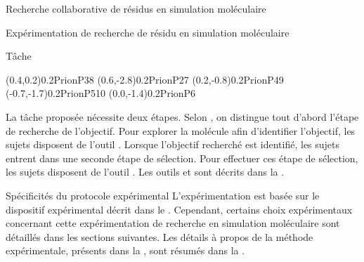 \documentclass[myfrancais]{mythesis}
\begin{document}
\begin{mychapter}{Recherche collaborative de résidus en simulation moléculaire}
\begin{mysection}{Expérimentation de recherche de résidu en simulation moléculaire}
\begin{mysubsection}{Tâche}
\begin{myfigure}
\begin{myps}
						\cnode(0.4,0.2){0.2}{PrionP38}
						\cnode(0.6,-2.8){0.2}{PrionP27}
						\cnode(0.2,-0.8){0.2}{PrionP49}
						\cnode(-0.7,-1.7){0.2}{PrionP510}
						\cnode(0.0,-1.4){0.2}{PrionP6}
					\end{myps}
				\end{myfigure}

				La tâche proposée nécessite deux étapes.
				Selon , on distingue tout d'abord l'étape de recherche de l'objectif.
				Pour explorer la molécule afin d'identifier l'objectif, les sujets disposent de l'outil .
				Lorsque l'objectif recherché est identifié, les sujets entrent dans une seconde étape de sélection.
				Pour effectuer ces étape de sélection, les sujets disposent de l'outil .
				Les outils  et  sont décrits dans la .
			\end{mysubsection}
			\begin{mysubsection}{Spécificités du protocole expérimental}
				L'expérimentation est basée sur le dispositif expérimental décrit dans le .
				Cependant, certains choix expérimentaux concernant cette expérimentation de recherche en simulation moléculaire sont détaillés dans les sections suivantes.
				Les détails à propos de la méthode expérimentale, présents dans la , sont résumés dans la .


\end{mysubsection}
\end{mysection}
\end{mychapter}
\end{document}
